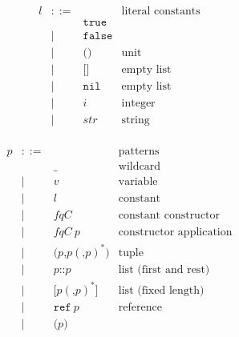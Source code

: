 \documentclass[12pt,a4paper]{book}
\newcommand{\gramsep}{|}
\begin{document}
 \[
\begin{array}{lcll}
l & ::= &&\mbox{literal constants}\\
&& \texttt{true}\\
&\gramsep& \texttt{false}\\
&\gramsep& \texttt{(}\texttt{)}&\mbox{unit}\\
&\gramsep& \texttt{[}\texttt{]}&\mbox{empty list}\\
&\gramsep& \texttt{nil}&\mbox{empty list}\\
&\gramsep& i &\mbox{integer}\\
&\gramsep& \textit{str} &\mbox{string}\\
 \end{array}
\]

\[
\begin{array}{lcll}
p & ::= & &\mbox{patterns}\\
&&\texttt{\_}&\mbox{wildcard}\\
&\gramsep& v &\mbox{variable}\\
&\gramsep& l &\mbox{constant}\\
&\gramsep& \mathit{fqC} & \mbox{constant constructor}\\
&\gramsep& \mathit{fqC}\ p & \mbox{constructor application}\\
&\gramsep& \texttt{(}p\texttt{,}p(\texttt{,}p)^*\texttt{)}&\mbox{tuple}\\
&\gramsep& p \texttt{::} p&\mbox{list (first and rest)}\\
&\gramsep& \texttt{[}p(\texttt{,}p)^*\texttt{]}&\mbox{list (fixed length)}\\
 &\gramsep& \texttt{ref}\ p&\mbox{reference}\\
 &\gramsep& \texttt{(}p\texttt{)}
 \end{array}
\]
\end{document}
